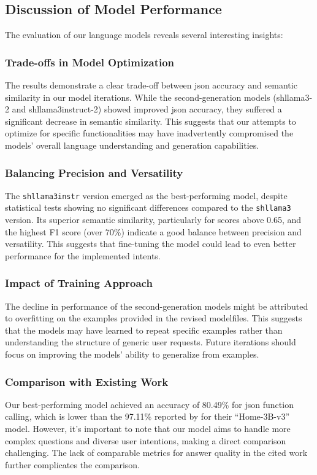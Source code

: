 \subsection{Discussion of Model Performance}
The evaluation of our language models reveals several interesting insights:
\subsubsection{Trade-offs in Model Optimization}
The results demonstrate a clear trade-off between \gls{json} accuracy and semantic similarity in our model iterations. While the second-generation models (shllama3-2 and shllama3instruct-2) showed improved \gls{json} accuracy, they suffered a significant decrease in semantic similarity. This suggests that our attempts to optimize for specific functionalities may have inadvertently compromised the models' overall language understanding and generation capabilities.
\subsubsection{Balancing Precision and Versatility}
The \texttt{shllama3instr} version emerged as the best-performing model, despite statistical tests showing no significant differences compared to the \texttt{shllama3} version. Its superior semantic similarity, particularly for scores above 0.65, and the highest F1 score (over 70\%) indicate a good balance between precision and versatility. This suggests that fine-tuning the model could lead to even better performance for the implemented intents.


\subsubsection{Impact of Training Approach}
The decline in performance of the second-generation models might be attributed to overfitting on the examples provided in the revised modelfiles. This suggests that the models may have learned to repeat specific examples rather than understanding the structure of generic user requests. Future iterations should focus on improving the models' ability to generalize from examples.
\subsubsection{Comparison with Existing Work}
Our best-performing model achieved an accuracy of 80.49\% for \gls{json} function calling, which is lower than the 97.11\% reported by \citet{acon96_home_llm} for their ``Home-3B-v3'' model. However, it's important to note that our model aims to handle more complex questions and diverse user intentions, making a direct comparison challenging. The lack of comparable metrics for answer quality in the cited work further complicates the comparison.

